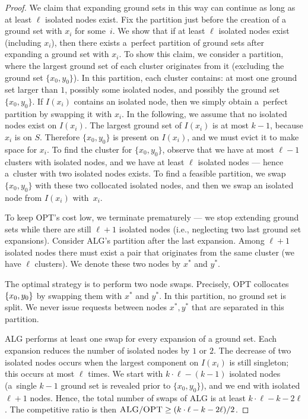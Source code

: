 \documentclass[a4paper,anonymous,USenglish]{lipics-v2019}
\newcommand{\OPT}{\textsc{OPT}\xspace}
\newcommand{\ALG}{\textsc{ALG}\xspace}
\DeclarePairedDelimiter\set{\{}{\}}
\begin{document}
\begin{proof}
	We claim that expanding ground sets in this way can continue as long as at least $\ell$ isolated nodes exist.
	Fix the partition just before the creation of a ground set with $x_i$ for some~$i$.
	We show that if at least $\ell$ isolated nodes exist (including $x_i$), then there exists a~perfect partition of ground sets after expanding a ground set with $x_i$.
	To show this claim, we consider a partition, where the largest ground set of each cluster originates from it (excluding the ground set $\{x_0, y_0\}$).
	In this partition, each cluster contains:  at most one ground set larger than $1$, possibly some isolated nodes, and possibly the ground set $\{x_0, y_0\}$.
	If $I(x_i)$ contains an isolated node, then we simply obtain a~perfect partition by swapping it with $x_i$.
	In the following, we assume that no isolated nodes exist on $I(x_i)$.
	The largest ground set of $I(x_i)$ is at most $k-1$, because $x_i$ is on $S$.
	Therefore $\{x_0, y_0\}$ is present on $I(x_i)$, and we must evict it to make space for $x_i$.
	To find the cluster for $\{x_0, y_0\}$, observe that we have at most $\ell-1$ clusters with isolated nodes, and we have at least $\ell$ isolated nodes --- hence a~cluster with two isolated nodes exists.
	To find a feasible partition, we swap $\{x_0, y_0\}$ with these two collocated isolated nodes, and then we swap an isolated node from $I(x_i)$ with~$x_i$.
	

	To keep \OPT's cost low, we terminate prematurely --- we stop extending ground sets while there are still $\ell+1$ isolated nodes (i.e., neglecting two last ground set expansions).
	Consider \ALG's partition after the last expansion.
	Among $\ell+1$ isolated nodes there must exist a pair that originates from the same cluster (we have $\ell$ clusters). 
	We denote these two nodes by $x^*$ and $y^*$.

	The optimal strategy is to perform two node swaps.
	Precisely, \OPT collocates $\set{x_0,y_0}$ by swapping them with $x^*$ and $y^*$.
	In this partition, no ground set is split.
	We never issue requests between nodes $x^*, y^*$ that are separated in this partition.


	\ALG performs at least one swap for every expansion of a ground set.
	Each expansion reduces the number of isolated nodes by $1$ or $2$.
	The decrease of two isolated nodes occurs when the largest component on  $I(x_i)$ is still singleton; this occurs at most $\ell$ times.
	We start with $k \cdot \ell - (k-1)$ isolated nodes (a~single $k-1$ ground set is revealed prior to $\{x_0, y_0\}$), and we end with isolated $\ell+1$ nodes.
	Hence, the total number of swaps of \ALG is at least $k\cdot \ell - k - 2 \ell$.
	The competitive ratio is then $\ALG / \OPT \geq (k\cdot \ell - k - 2\ell) / 2$.
\end{proof}
\end{document}
